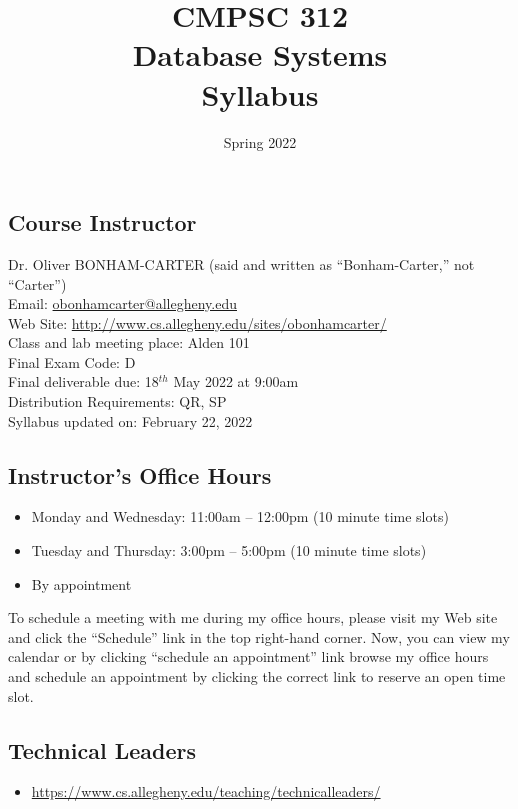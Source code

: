 \documentclass[11pt]{article} %
\title{\textbf{CMPSC 312\\ Database Systems\\Syllabus}}
\author{Spring 2022}
\date{} %
\begin{document}
\maketitle




\subsection*{\textbf{Course Instructor}}
Dr. Oliver BONHAM-CARTER (said and written as ``Bonham-Carter,'' not “Carter'')\\
\noindent Email: \url{obonhamcarter@allegheny.edu} \\
\noindent Web Site: \url{http://www.cs.allegheny.edu/sites/obonhamcarter/} \\
\noindent Class and lab meeting place: Alden 101\\
\noindent Final Exam Code: D\\  
\noindent Final deliverable due: 18$^{th}$ May 2022 at 9:00am\\ %
\noindent Distribution Requirements: QR, SP\\
\noindent Syllabus updated on: February 22, 2022%





\subsection*{\textbf{Instructor's Office Hours}}

\begin{itemize}
  \itemsep 0em
  \item Monday and Wednesday: 11:00am -- 12:00pm (10 minute time slots)
  \item Tuesday and Thursday: 3:00pm -- 5:00pm (10 minute time slots)
  \item By appointment
\end{itemize}


\noindent
To schedule a meeting with me during my office hours, please visit my Web site and click the ``Schedule'' link in the top right-hand corner. Now, you can view my calendar or by clicking ``schedule an appointment'' link browse my office hours and schedule an appointment by clicking the correct link to reserve an open time slot. 


\subsection*{\textbf{Technical Leaders}}
	\begin{itemize}
		\item   \url{https://www.cs.allegheny.edu/teaching/technicalleaders/}
	\end{itemize}
\end{document}
